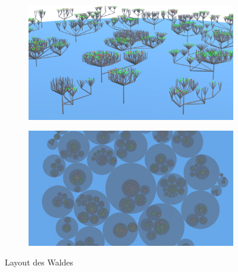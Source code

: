 %

\begin{figure}[htb]
  \centering
  \begin{subfigure}[t]{\textwidth}
    \centering
    \includegraphics[width=\textwidth]{figures/layout-3}
     \label{fig:project-selection}
  \end{subfigure}
  \par\bigskip
  \begin{subfigure}[t]{\textwidth}
    \centering
  	\includegraphics[width=\textwidth]{figures/circle-packing-2}
  	 \label{fig:title-bar}
  \end{subfigure}
  \caption{Layout des Waldes} \label{fig:app-menu}
\end{figure}


